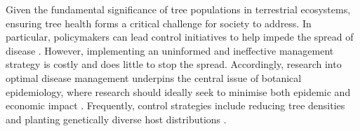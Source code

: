 Given the fundamental significance of tree populations in terrestrial ecosystems, ensuring tree health forms a critical challenge for society to address.
In particular, policymakers can lead control initiatives to help impede the spread of disease \cite{Gilligan-disease-management}.
However, implementing an uninformed and ineffective management strategy is costly and does little to stop the spread.
Accordingly, research into optimal disease management underpins the central issue of botanical epidemiology, 
where research should ideally seek to minimise both epidemic and economic impact \cite{ash-dieback-costs, freer2017tree, boyd2013consequence, tyrvainen2005benefits}. 
Frequently, control strategies include reducing tree densities \cite{pietzsch2021effect, resiliency-density-reductions} and planting genetically diverse host distributions \cite{doi:10.1094/PD-89-0969, genetic-heterogeneity, huang1980importance}.




